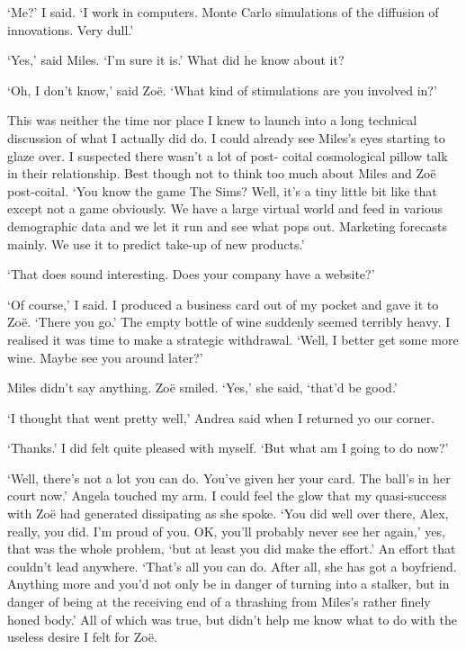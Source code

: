 `Me?' I said. `I work in computers. Monte Carlo simulations of the
diffusion of innovations. Very dull.'

`Yes,' said Miles. `I'm sure it is.' What did he know about
it?

`Oh, I don't know,' said Zoë. `What kind of stimulations are you
involved in?'

This was neither the time nor place I knew to launch into a long
technical discussion of what I actually did do. I could already see Miles's eyes
starting to glaze over. I suspected there wasn't a lot of post-
coital cosmological pillow talk in their relationship. Best though not to
think too much about Miles and Zoë post-coital. `You know the
game {\twelvesl The Sims\/}? Well, it's a tiny little bit like that except not a game obviously.
We have a large virtual world and feed in various demographic data
and we let it run and see what pops out. Marketing forecasts mainly.
We use it to predict take-up of new products.'

`That does sound interesting. Does your company have a website?'

`Of course,' I said. I produced a business card out of my pocket and
gave it to Zoë. `There you go.' The empty bottle of wine suddenly seemed terribly heavy. I realised it was time to make a strategic
withdrawal. `Well, I better get some more wine. Maybe see you around
later?'

Miles didn't say anything. Zoë smiled. `Yes,' she said, `that'd
be good.'

`I thought that went pretty well,' Andrea said when I returned yo
our corner.

`Thanks.' I did felt quite pleased with myself. `But what am I going
to do now?'

`Well, there's not a lot you can do. You've given her your card. The
ball's in her court now.' Angela touched my arm. I could feel the
glow that my quasi-success with Zoë had generated dissipating as
she spoke. `You did well over there, Alex, really, you did. I'm
proud of you. OK, you'll probably never see her again,' yes, that
was the whole problem, `but at least you did make the effort.' An
effort that couldn't lead anywhere. `That's all you can do. After
all, she has got a boyfriend. Anything more and you'd not only be in
danger of turning into a stalker, but in danger of being at the
receiving end of a thrashing from Miles's rather finely honed body.'
All of which was true, but didn't help me know what to do with the
useless desire I felt for Zoë.


